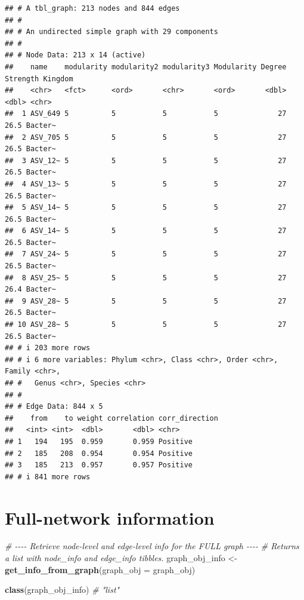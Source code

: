 \documentclass[
]{book}
\newenvironment{Shaded}{\begin{snugshade}}{\end{snugshade}}
\newcommand{\AttributeTok}[1]{\textcolor[rgb]{0.13,0.29,0.53}{#1}}
\newcommand{\CommentTok}[1]{\textcolor[rgb]{0.56,0.35,0.01}{\textit{#1}}}
\newcommand{\FunctionTok}[1]{\textcolor[rgb]{0.13,0.29,0.53}{\textbf{#1}}}
\newcommand{\NormalTok}[1]{#1}
\newcommand{\OtherTok}[1]{\textcolor[rgb]{0.56,0.35,0.01}{#1}}
\begin{document}
\begin{verbatim}
## # A tbl_graph: 213 nodes and 844 edges
## #
## # An undirected simple graph with 29 components
## #
## # Node Data: 213 x 14 (active)
##    name    modularity modularity2 modularity3 Modularity Degree Strength Kingdom
##    <chr>   <fct>      <ord>       <chr>       <ord>       <dbl>    <dbl> <chr>  
##  1 ASV_649 5          5           5           5              27     26.5 Bacter~
##  2 ASV_705 5          5           5           5              27     26.5 Bacter~
##  3 ASV_12~ 5          5           5           5              27     26.5 Bacter~
##  4 ASV_13~ 5          5           5           5              27     26.5 Bacter~
##  5 ASV_14~ 5          5           5           5              27     26.5 Bacter~
##  6 ASV_14~ 5          5           5           5              27     26.5 Bacter~
##  7 ASV_24~ 5          5           5           5              27     26.5 Bacter~
##  8 ASV_25~ 5          5           5           5              27     26.4 Bacter~
##  9 ASV_28~ 5          5           5           5              27     26.5 Bacter~
## 10 ASV_28~ 5          5           5           5              27     26.5 Bacter~
## # i 203 more rows
## # i 6 more variables: Phylum <chr>, Class <chr>, Order <chr>, Family <chr>,
## #   Genus <chr>, Species <chr>
## #
## # Edge Data: 844 x 5
##    from    to weight correlation corr_direction
##   <int> <int>  <dbl>       <dbl> <chr>         
## 1   194   195  0.959       0.959 Positive      
## 2   185   208  0.954       0.954 Positive      
## 3   185   213  0.957       0.957 Positive      
## # i 841 more rows
\end{verbatim}

\section{Full-network information}\label{full-network-information}

\begin{Shaded}
\begin{Highlighting}[]
\CommentTok{\# {-}{-}{-}{-} Retrieve node{-}level and edge{-}level info for the FULL graph {-}{-}{-}{-}}
\CommentTok{\# Returns a list with \textasciigrave{}node\_info\textasciigrave{} and \textasciigrave{}edge\_info\textasciigrave{} tibbles.}
\NormalTok{graph\_obj\_info }\OtherTok{\textless{}{-}} \FunctionTok{get\_info\_from\_graph}\NormalTok{(}\AttributeTok{graph\_obj =}\NormalTok{ graph\_obj)}

\FunctionTok{class}\NormalTok{(graph\_obj\_info)         }\CommentTok{\# "list"}
\end{Highlighting}
\end{Shaded}
\end{document}
